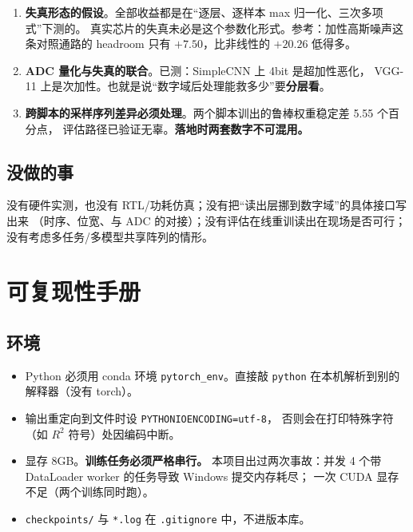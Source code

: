 \documentclass[11pt,a4paper]{ctexart}
\begin{document}
\begin{enumerate}[leftmargin=2em,itemsep=2pt]
  \item \textbf{失真形态的假设}。全部收益都是在“逐层、逐样本 max 归一化、三次多项式”下测的。
        真实芯片的失真未必是这个参数化形式。参考：加性高斯噪声这条对照通路的
        headroom 只有 $+7.50$，比非线性的 $+20.26$ 低得多。
  \item \textbf{ADC 量化与失真的联合}。已测：SimpleCNN 上 4bit 是超加性恶化，
        VGG-11 上是次加性。也就是说“数字域后处理能救多少”要\textbf{分层看}。
  \item \textbf{跨脚本的采样序列差异必须处理}。两个脚本训出的鲁棒权重稳定差 5.55 个百分点，
        评估路径已验证无辜。\textbf{落地时两套数字不可混用。}
\end{enumerate}

\subsection{没做的事}

没有硬件实测，也没有 RTL/功耗仿真；没有把“读出层挪到数字域”的具体接口写出来
（时序、位宽、与 ADC 的对接）；没有评估在线重训读出在现场是否可行；
没有考虑多任务/多模型共享阵列的情形。

\section{可复现性手册}
\label{sec:repro}

\subsection{环境}

\begin{itemize}[leftmargin=2em,itemsep=2pt]
  \item Python 必须用 conda 环境 \texttt{pytorch\_env}。直接敲 \texttt{python}
        在本机解析到别的解释器（没有 torch）。
  \item 输出重定向到文件时设 \texttt{PYTHONIOENCODING=utf-8}，
        否则会在打印特殊字符（如 $R^2$ 符号）处因编码中断。
  \item 显存 8GB。\textbf{训练任务必须严格串行。}
        本项目出过两次事故：并发 4 个带 DataLoader worker 的任务导致 Windows 提交内存耗尽；
        一次 CUDA 显存不足（两个训练同时跑）。
  \item \texttt{checkpoints/} 与 \texttt{*.log} 在 \texttt{.gitignore} 中，不进版本库。
\end{itemize}
\end{document}
